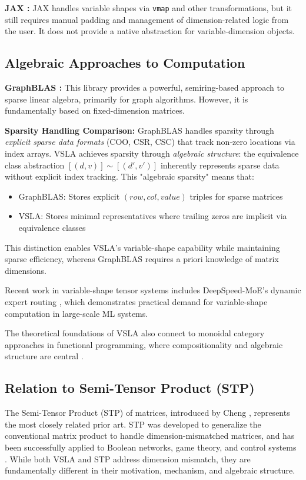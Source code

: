 \textbf{JAX \cite{JAX2020}:} JAX handles variable shapes via \texttt{vmap} and other transformations, but it still requires manual padding and management of dimension-related logic from the user. It does not provide a native abstraction for variable-dimension objects.

\subsection{Algebraic Approaches to Computation}

\textbf{GraphBLAS \cite{GraphBLAS2019}:} This library provides a powerful, semiring-based approach to sparse linear algebra, primarily for graph algorithms. However, it is fundamentally based on fixed-dimension matrices. 

\textbf{Sparsity Handling Comparison:} GraphBLAS handles sparsity through \textit{explicit sparse data formats} (COO, CSR, CSC) that track non-zero locations via index arrays. VSLA achieves sparsity through \textit{algebraic structure}: the equivalence class abstraction $[(d,v)] \sim [(d',v')]$ inherently represents sparse data without explicit index tracking. This "algebraic sparsity" means that:
\begin{itemize}
\item GraphBLAS: Stores explicit $(row, col, value)$ triples for sparse matrices
\item VSLA: Stores minimal representatives where trailing zeros are implicit via equivalence classes
\end{itemize}
This distinction enables VSLA's variable-shape capability while maintaining sparse efficiency, whereas GraphBLAS requires a priori knowledge of matrix dimensions.

Recent work in variable-shape tensor systems includes DeepSpeed-MoE's dynamic expert routing \cite{Rajbhandari2022}, which demonstrates practical demand for variable-shape computation in large-scale ML systems.

The theoretical foundations of VSLA also connect to monoidal category approaches in functional programming, where compositionality and algebraic structure are central \cite{Selinger2010, FongSpivak2019}.

\subsection{Relation to Semi-Tensor Product (STP)}
The Semi-Tensor Product (STP) of matrices, introduced by Cheng \cite{Cheng2001}, represents the most closely related prior art. STP was developed to generalize the conventional matrix product to handle dimension-mismatched matrices, and has been successfully applied to Boolean networks, game theory, and control systems \cite{Cheng2011}. While both VSLA and STP address dimension mismatch, they are fundamentally different in their motivation, mechanism, and algebraic structure.

